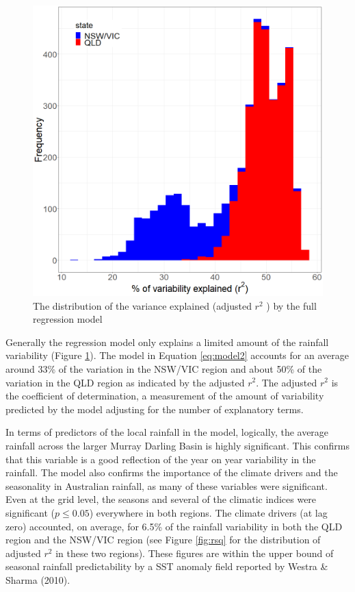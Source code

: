 \documentclass[fleqn,10pt,lineno]{wlpeerj} %
\theoremstyle{definition}
\theoremstyle{definition}
\theoremstyle{definition}
\theoremstyle{remark}
\begin{document}
\begin{figure}
\includegraphics[width=0.7\linewidth]{figures/Fig6} \caption{The distribution of the variance explained (adjusted $r^2$ ) by the full regression model}\label{fig:rsqmodel}
\end{figure}

Generally the regression model only explains a limited amount of the
rainfall variability (Figure \ref{fig:rsqmodel}). The model in Equation
\eqref{eq:model2} accounts for an average around 33\% of the variation in
the NSW/VIC region and about 50\% of the variation in the QLD region as
indicated by the adjusted \(r^2\). The adjusted \(r^2\) is the
coefficient of determination, a measurement of the amount of variability
predicted by the model adjusting for the number of explanatory terms.

In terms of predictors of the local rainfall in the model, logically,
the average rainfall across the larger Murray Darling Basin is highly
significant. This confirms that this variable is a good reflection of
the year on year variability in the rainfall. The model also confirms
the importance of the climate drivers and the seasonality in Australian
rainfall, as many of these variables were significant. Even at the grid
level, the seasons and several of the climatic indices were significant
(\(p \leq 0.05\)) everywhere in both regions. The climate drivers (at
lag zero) accounted, on average, for 6.5\% of the rainfall variability
in both the QLD region and the NSW/VIC region (see Figure \ref{fig:rsq}
for the distribution of adjusted \(r^2\) in these two regions). These
figures are within the upper bound of seasonal rainfall predictability
by a SST anomaly field reported by Westra \& Sharma (2010).
\end{document}
